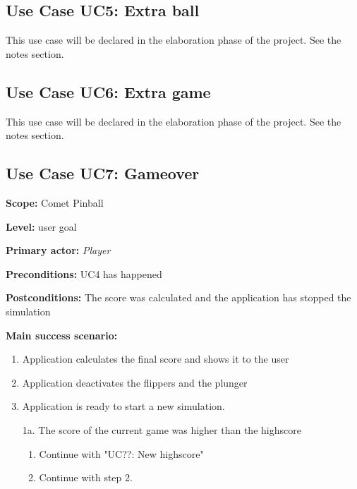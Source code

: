 \documentclass[fontsize=12pt,
               paper=a4,
               twoside=false,
               parskip=half,
               ]{scrartcl}
\begin{document}


\subsection{Use Case UC5: Extra ball}

This use case will be declared in the elaboration phase of the project. See the notes section.


\subsection{Use Case UC6: Extra game}

This use case will be declared in the elaboration phase of the project. See the notes section.


\subsection{Use Case UC7: Gameover}

\textbf{\textsf{Scope:}} Comet Pinball

\textbf{\textsf{Level:}} user goal

\textbf{\textsf{Primary actor:}} \emph{Player}

\textbf{\textsf{Preconditions:}} UC4 has happened

\textbf{\textsf{Postconditions:}} The score was calculated and the application has stopped the simulation

\textbf{\textsf{Main success scenario:}}

\begin{enumerate}[leftmargin=3em]
	\item Application calculates the final score and shows it to the user
	\item Application deactivates the flippers and the plunger
	\item Application is ready to start a new simulation.
\end{enumerate}


\begin{itemize}[leftmargin=3em]
	\item[1a.]  The score of the current game was higher than the highscore
	\begin{enumerate}
		\item Continue with "UC??: New highscore"
		\item Continue with step 2.
	\end{enumerate}
\end{itemize}
\end{document}
